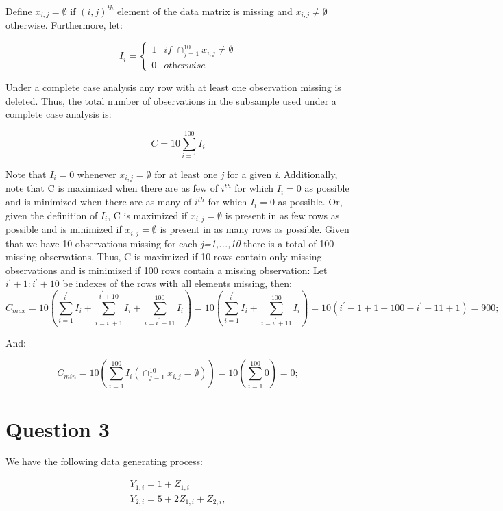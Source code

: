 \documentclass{article}
\begin{document}
Define  $x_{i,j}=\emptyset$ if  $(i,j)^{th}$ element of the data matrix is missing and $x_{i,j}{\ne}\emptyset$ otherwise. Furthermore, let:

\[
I_{i}=
\begin{cases}
1 & \textit{if $\cap^{10}_{j=1}x_{i,j}{\ne}\emptyset$}\\
0 & \textit{otherwise}
\end{cases}
\]

Under a complete case analysis any row with at least one observation missing is deleted. Thus, the total number of observations in the subsample used under a complete case analysis is:

\[
C=10\sum^{100}_{i=1}I_{i}
\] 

Note that $I_{i}=0$ whenever $x_{i,j}=\emptyset$ for at least one \textit{j} for a given \textit{i}. Additionally, note that C is maximized when there are as few of $i^{th}$ for which  $I_{i}=0$ as possible and is minimized when there are as many of $i^{th}$ for which  $I_{i}=0$ as possible. Or, given the definition of $I_{i}$, C is maximized if $x_{i,j}=\emptyset$ is present in as few rows as possible and is minimized if $x_{i,j}=\emptyset$ is present in as many rows as possible. Given that we have 10 observations missing for each \textit{j=1,...,10} there is a total of 100 missing observations. Thus, C is maximized if 10 rows contain only missing observations and is minimized if 100 rows contain a missing observation:
Let $i^{'}+1:i^{'}+10$ be indexes of the rows with all elements missing, then:
\[
C_{max}=10\left(\sum^{i^{'}}_{i=1}I_{i}+\sum^{i^{'}+10}_{i=i^{'}+1}I_{i}+\sum^{100}_{i=i^{'}+11}I_{i}\right)=10\left(\sum^{i^{'}}_{i=1}I_{i}+\sum^{100}_{i=i^{'}+11}I_{i}\right)=10(i^{'}-1+1+100-i^{'}-11+1)=900;
\]  

And:

\[
C_{min}=10\left(\sum^{100}_{i=1}I_{i}(\cap^{10}_{j=1}x_{i,j}=\emptyset)\right)=10\left(\sum^{100}_{i=1}0\right)=0;
\]  

\section*{Question 3}

We have the following data generating process:

\begin{equation}\label{Eq_1}\begin{array}{c}
Y_{1,i}=1+Z_{1,i}\\
Y_{2,i}=5+2Z_{1,i}+Z_{2,i},
\end{array}\end{equation}
\end{document}
